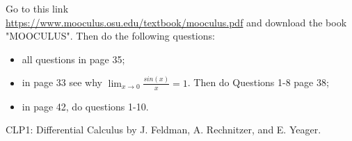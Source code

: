 \documentclass[12pt,a4paper]{book}
\numberwithin{equation}{section}
\begin{document}
\newpage

\begin{tcolorbox}[width=\textwidth,colback={red!30},title={},colbacktitle=yellow,coltitle=blue] 
\end{tcolorbox}

Go to this link\\ \href{https://www.mooculus.osu.edu/textbook/mooculus.pdf}{https://www.mooculus.osu.edu/textbook/mooculus.pdf} and download the book "MOOCULUS". Then do the following questions:
\begin{itemize}
	\item all questions in page 35;
	\item in page 33 see why $\lim_{x\to 0}\frac{sin(x)}{x}=1$. Then do Questions 1-8 page 38;
	\item in page 42, do questions 1-10.
\end{itemize}



\begin{thebibliography}{9}
	  CLP1: Differential Calculus by J. Feldman, A. Rechnitzer, and E. Yeager.
	
\end{thebibliography}
\end{document}
